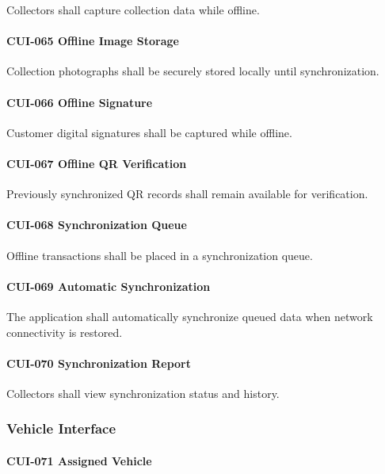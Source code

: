 Collectors shall capture collection data while offline.

\paragraph{CUI-065 Offline Image Storage}

Collection photographs shall be securely stored locally until
synchronization.

\paragraph{CUI-066 Offline Signature}

Customer digital signatures shall be captured while offline.

\paragraph{CUI-067 Offline QR Verification}

Previously synchronized QR records shall remain available for
verification.

\paragraph{CUI-068 Synchronization Queue}

Offline transactions shall be placed in a synchronization queue.

\paragraph{CUI-069 Automatic Synchronization}

The application shall automatically synchronize queued data when
network connectivity is restored.

\paragraph{CUI-070 Synchronization Report}

Collectors shall view synchronization status and history.


\subsubsection*{Vehicle Interface}

\paragraph{CUI-071 Assigned Vehicle}

